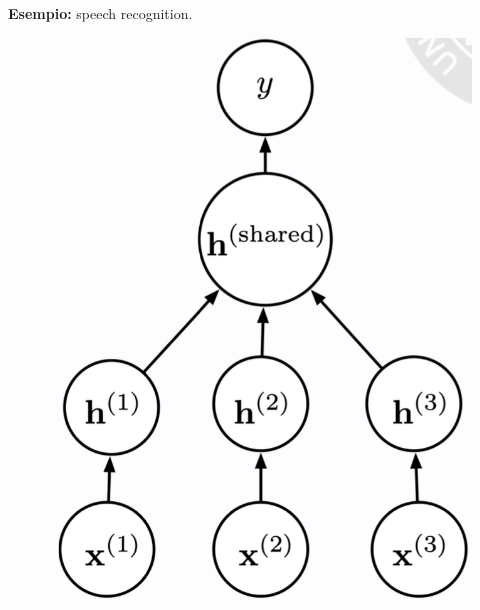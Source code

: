 \textbf{Esempio:} speech recognition.
\begin{figure}[!h]
  \includegraphics[scale=.5]{images/representation_learning/speech_rec.png}
  \centering
\end{figure}
\newpage
